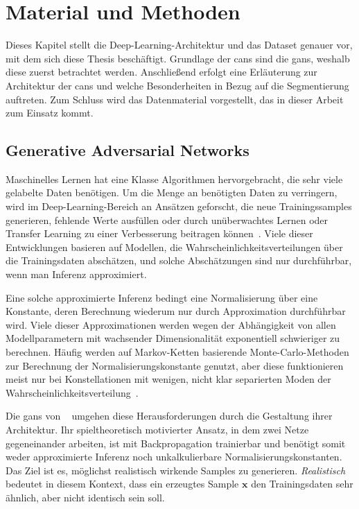 \chapter{Material und Methoden}

Dieses Kapitel stellt die Deep-Learning-Architektur und das Dataset genauer vor, mit dem sich diese Thesis beschäftigt.
Grundlage der \glspl{can} sind die \glspl{gan}, weshalb diese zuerst betrachtet werden.
Anschließend erfolgt eine Erläuterung zur Architektur der \glspl{can} und welche Besonderheiten in Bezug auf die Segmentierung auftreten.
Zum Schluss wird das Datenmaterial vorgestellt, das in dieser Arbeit zum Einsatz kommt.



\section{Generative Adversarial Networks}

Maschinelles Lernen hat eine Klasse Algorithmen hervorgebracht, die sehr viele gelabelte Daten benötigen.
Um die Menge an benötigten Daten zu verringern, wird im Deep-Learning-Bereich an Ansätzen geforscht, die neue Trainingssamples generieren, fehlende Werte ausfüllen oder durch unüberwachtes Lernen oder Transfer Learning zu einer Verbesserung beitragen können~\cite{Goodfellow.2016}.
Viele dieser Entwicklungen basieren auf Modellen, die Wahrscheinlichkeitsverteilungen über die Trainingsdaten abschätzen, und solche Abschätzungen sind nur durchführbar, wenn man Inferenz approximiert.

Eine solche approximierte Inferenz bedingt eine Normalisierung über eine Konstante, deren Berechnung wiederum nur durch Approximation durchführbar wird.
Viele dieser Approximationen werden wegen der Abhängigkeit von allen Modellparametern mit wachsender Dimensionalität exponentiell schwieriger zu berechnen.
Häufig werden auf Markov-Ketten basierende Monte-Carlo-Methoden~\cite{Koller.2009} zur Berechnung der Normalisierungskonstante genutzt, aber diese funktionieren meist nur bei Konstellationen mit wenigen, nicht klar separierten Moden der Wahrscheinlichkeitsverteilung~\cite{Goodfellow.2016}.

Die \glspl{gan} von \citeauthor{Goodfellow.2014}~\cite{Goodfellow.2014} umgehen diese Herausforderungen durch die Gestaltung ihrer Architektur.
Ihr spieltheoretisch motivierter Ansatz, in dem zwei Netze gegeneinander arbeiten, ist mit Backpropagation trainierbar und benötigt somit weder approximierte Inferenz noch unkalkulierbare Normalisierungskonstanten.
Das Ziel ist es, möglichst realistisch wirkende Samples zu generieren.
\emph{Realistisch} bedeutet in diesem Kontext, dass ein erzeugtes Sample $ \mathbf{x} $ den Trainingsdaten sehr ähnlich, aber nicht identisch sein soll.

